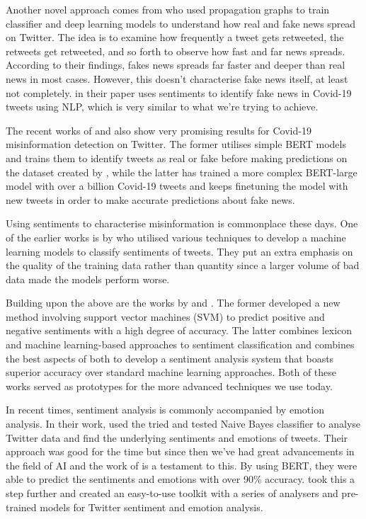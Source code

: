 \documentclass{l4proj}
\begin{document}
Another novel approach comes from \cite{inbook} who used propagation graphs to train classifier and deep learning models to understand how real and fake news spread on Twitter. The idea is to examine how frequently a tweet gets retweeted, the retweets get retweeted, and so forth to observe how fast and far news spreads. According to their findings, fakes news spreads far faster and deeper than real news in most cases. However, this doesn't characterise fake news itself, at least not completely. \cite{lan9199} in their paper uses sentiments to identify fake news in Covid-19 tweets using NLP, which is very similar to what we're trying to achieve.

The recent works of \cite{jaimemv} and \cite{muller2020covid} also show very promising results for Covid-19 misinformation detection on Twitter. The former utilises simple BERT models and trains them to identify tweets as real or fake before making predictions on the dataset created by \cite{banda_juan_m_2021_5652342}, while the latter has trained a more complex BERT-large model with over a billion Covid-19 tweets and keeps finetuning the model with new tweets in order to make accurate predictions about fake news.

Using sentiments to characterise misinformation is commonplace these days. One of the earlier works is by \cite{Sarlan2014TwitterSA} who utilised various techniques to develop a machine learning models to classify sentiments of tweets. They put an extra emphasis on the quality of the training data rather than quantity since a larger volume of bad data made the models perform worse.

Building upon the above are the works by \cite{Roy2017ANS} and \cite{Gound2018TwitterDS}. The former developed a new method involving support vector machines (SVM) to predict positive and negative sentiments with a high degree of accuracy. The latter combines lexicon and machine learning-based approaches to sentiment classification and combines the best aspects of both to develop a sentiment analysis system that boasts superior accuracy over standard machine learning approaches. Both of these works served as prototypes for the more advanced techniques we use today.

In recent times, sentiment analysis is commonly accompanied by emotion analysis. In their work, \cite{SAILUNAZ2019101003} used the tried and tested Naive Bayes classifier to analyse Twitter data and find the underlying sentiments and emotions of tweets. Their approach was good for the time but since then we've had great advancements in the field of AI and the work of \cite{inproceedings} is a testament to this. By using BERT, they were able to predict the sentiments and emotions with over 90\% accuracy. \cite{perez2021pysentimiento} took this a step further and created an easy-to-use toolkit with a series of analysers and pre-trained models for Twitter sentiment and emotion analysis.
\end{document}
